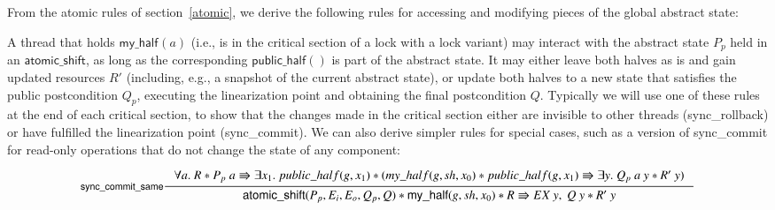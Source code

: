\documentclass[a4paper,USenglish,cleveref, autoref, thm-restate]{lipics-v2021}
\newcommand{\myhalf}[2]{\ensuremath{\mathsf{my\_half}_{#1}(#2)}}
\newcommand{\publichalf}[1]{\ensuremath{\mathsf{public\_half}(#1)}}
\begin{document}
From the atomic rules of section~\ref{atomic}, we derive the following rules for accessing and modifying pieces of the global abstract state:
\begin{mathpar}

\end{mathpar}
A thread that holds $\myhalf{}{a}$ (i.e., is in the critical section of a lock with a lock variant) may interact with the abstract state $P_p$ held in an $\textsf{atomic\_shift}$, as long as the corresponding $\publichalf{}$ is part of the abstract state. It may either leave both halves as is and gain updated resources $R'$ (including, e.g., a snapshot of the current abstract state), or update both halves to a new state that satisfies the public postcondition $Q_p$, executing the linearization point and obtaining the final postcondition $Q$. Typically we will use one of these rules at the end of each critical section, to show that the changes made in the critical section either are invisible to other threads (\textsf{sync\_rollback}) or have fulfilled the linearization point (\textsf{sync\_commit}). We can also derive simpler rules for special cases, such as a version of \textsf{sync\_commit} for read-only operations that do not change the state of any component:

$$\inference[\textsf{sync\_commit\_same}]{\forall a.\ R * P_p\ a \Rrightarrow \exists x_1.\ \mathsf{public\_half}(g, x_1) * (\mathsf{my\_half}(g, \mathit{sh}, x_0) * \mathsf{public\_half}(g, x_1) \Rrightarrow \exists y.\ Q_p\ a\ y * R'\ y)}{\textsf{atomic\_shift}(P_p, E_i, E_o, Q_p, Q) * \textsf{my\_half}(g,sh,x_0) * R \Rrightarrow \mathsf{EX}\ y,\ Q\ y * R'\ y}$$
\end{document}
